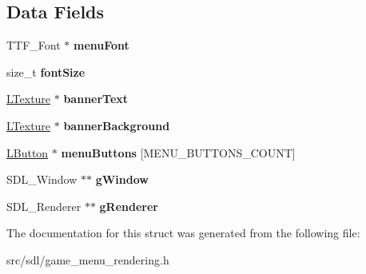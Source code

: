 \subsection*{Data Fields}
\begin{DoxyCompactItemize}
\item 
\mbox{\label{structmenu_aec81a913a2bdf7db9fa55631ac232cbd}} 
T\+T\+F\+\_\+\+Font $\ast$ {\bfseries menu\+Font}
\item 
\mbox{\label{structmenu_a48e5d82d2c83eb5f30f0b5329a15f103}} 
size\+\_\+t {\bfseries font\+Size}
\item 
\mbox{\label{structmenu_aa3c91e91465b65a7dc5a3245b6e105f7}} 
\hyperlink{structtexture}{L\+Texture} $\ast$ {\bfseries banner\+Text}
\item 
\mbox{\label{structmenu_aa8e15e8629ba7f2cdab66418f4e8647b}} 
\hyperlink{structtexture}{L\+Texture} $\ast$ {\bfseries banner\+Background}
\item 
\mbox{\label{structmenu_aaa6a726c45ebf13e6ce59e69a82aca4a}} 
\hyperlink{structbutton}{L\+Button} $\ast$ {\bfseries menu\+Buttons} \mbox{[}M\+E\+N\+U\+\_\+\+B\+U\+T\+T\+O\+N\+S\+\_\+\+C\+O\+U\+NT\mbox{]}
\item 
\mbox{\label{structmenu_a04da60f12d502931bdcc034cad86347f}} 
S\+D\+L\+\_\+\+Window $\ast$$\ast$ {\bfseries g\+Window}
\item 
\mbox{\label{structmenu_ad916adf6a3c707eda83ceefbdee69a26}} 
S\+D\+L\+\_\+\+Renderer $\ast$$\ast$ {\bfseries g\+Renderer}
\end{DoxyCompactItemize}


The documentation for this struct was generated from the following file\+:\begin{DoxyCompactItemize}
\item 
src/sdl/game\+\_\+menu\+\_\+rendering.\+h\end{DoxyCompactItemize}
